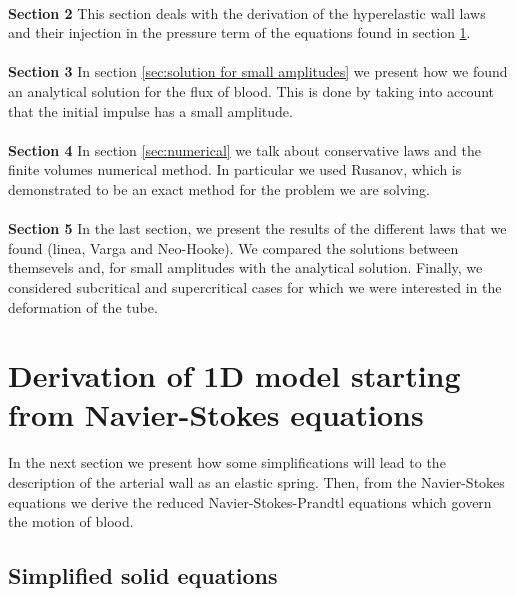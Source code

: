 \documentclass[12pt,a4paper]{article}
\numberwithin{equation}{section}
\begin{document}
\\
{\bf Section 2} \hspace{1mm} This section deals with the derivation of the hyperelastic wall laws and their injection in the pressure term of the equations found in section \ref{sec:1}.\\
\\
{\bf Section 3} \hspace{1mm} In section \ref{sec:solution for small amplitudes} we present how we found an analytical solution for the flux of blood. This is done by taking into account that the initial impulse has a small amplitude.\\
\\
{\bf Section 4} \hspace{1mm} In section \ref{sec:numerical} we talk about conservative laws and the finite volumes numerical method. In particular we used Rusanov, which is demonstrated to be an exact method for the problem we are solving.\\
\\
{\bf Section 5} \hspace{1mm} In the last section, we present the results of the different laws that we found (linea, Varga and Neo-Hooke). We compared the solutions between themsevels and, for small amplitudes with the analytical solution. Finally, we considered subcritical and supercritical cases for which we were interested in the deformation of the tube.

\newpage
\section{Derivation of 1D model starting from Navier-Stokes equations}
\label{sec:1}
In the next section we present how some simplifications will lead to the description of the arterial wall as an elastic spring. Then, from the Navier-Stokes equations we derive the reduced Navier-Stokes-Prandtl equations which govern the motion of blood.

\subsection{Simplified solid equations}
\end{document}
